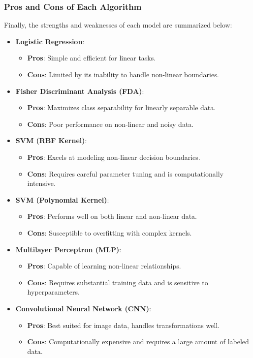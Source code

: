 \documentclass{article}
\begin{document}
\subsubsection{Pros and Cons of Each Algorithm}
Finally, the strengths and weaknesses of each model are summarized below:
\begin{itemize}
    \item \textbf{Logistic Regression}:
        \begin{itemize}
            \item \textbf{Pros}: Simple and efficient for linear tasks.
            \item \textbf{Cons}: Limited by its inability to handle non-linear boundaries.
        \end{itemize}
    \item \textbf{Fisher Discriminant Analysis (FDA)}:
        \begin{itemize}
            \item \textbf{Pros}: Maximizes class separability for linearly separable data.
            \item \textbf{Cons}: Poor performance on non-linear and noisy data.
        \end{itemize}
    \item \textbf{SVM (RBF Kernel)}:
        \begin{itemize}
            \item \textbf{Pros}: Excels at modeling non-linear decision boundaries.
            \item \textbf{Cons}: Requires careful parameter tuning and is computationally intensive.
        \end{itemize}
    \item \textbf{SVM (Polynomial Kernel)}:
        \begin{itemize}
            \item \textbf{Pros}: Performs well on both linear and non-linear data.
            \item \textbf{Cons}: Susceptible to overfitting with complex kernels.
        \end{itemize}
    \item \textbf{Multilayer Perceptron (MLP)}:
        \begin{itemize}
            \item \textbf{Pros}: Capable of learning non-linear relationships.
            \item \textbf{Cons}: Requires substantial training data and is sensitive to hyperparameters.
        \end{itemize}
    \item \textbf{Convolutional Neural Network (CNN)}:
        \begin{itemize}
            \item \textbf{Pros}: Best suited for image data, handles transformations well.
            \item \textbf{Cons}: Computationally expensive and requires a large amount of labeled data.
        \end{itemize}
\end{itemize}
\end{document}
